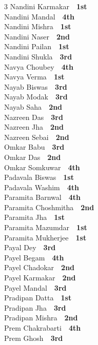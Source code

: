 \documentclass[11pt,a4paper]{article}
\begin{document}
\begin{multicols}{3}
Nandini Karmakar~\dotfill~\textbf{1st}\\
Nandini Mandal~\dotfill~\textbf{4th}\\
Nandini Mishra~\dotfill~\textbf{1st}\\
Nandini Naser~\dotfill~\textbf{2nd}\\
Nandini Pailan~\dotfill~\textbf{1st}\\
Nandini Shukla~\dotfill~\textbf{3rd}\\
Navya Choubey~\dotfill~\textbf{4th}\\
Navya Verma~\dotfill~\textbf{1st}\\
Nayab Biswas~\dotfill~\textbf{3rd}\\
Nayab Modak~\dotfill~\textbf{3rd}\\
Nayab Saha~\dotfill~\textbf{2nd}\\
Nazreen Das~\dotfill~\textbf{3rd}\\
Nazreen Jha~\dotfill~\textbf{2nd}\\
Nazreen Sebai~\dotfill~\textbf{2nd}\\
Omkar Babu~\dotfill~\textbf{3rd}\\
Omkar Das~\dotfill~\textbf{2nd}\\
Omkar Somkuwar~\dotfill~\textbf{4th}\\
Padavala Biswas~\dotfill~\textbf{1st}\\
Padavala Washim~\dotfill~\textbf{4th}\\
Paramita Barnwal~\dotfill~\textbf{4th}\\
Paramita Choshmitha~\dotfill~\textbf{2nd}\\
Paramita Jha~\dotfill~\textbf{1st}\\
Paramita Mazumdar~\dotfill~\textbf{1st}\\
Paramita Mukherjee~\dotfill~\textbf{1st}\\
Payal Dey~\dotfill~\textbf{3rd}\\
Payel Begam~\dotfill~\textbf{4th}\\
Payel Chadokar~\dotfill~\textbf{2nd}\\
Payel Karmakar~\dotfill~\textbf{2nd}\\
Payel Mandal~\dotfill~\textbf{3rd}\\
Pradipan Datta~\dotfill~\textbf{1st}\\
Pradipan Jha~\dotfill~\textbf{3rd}\\
Pradipan Mishra~\dotfill~\textbf{2nd}\\
Prem Chakrabarti~\dotfill~\textbf{4th}\\
Prem Ghosh~\dotfill~\textbf{3rd}\\

\end{multicols}
\end{document}
